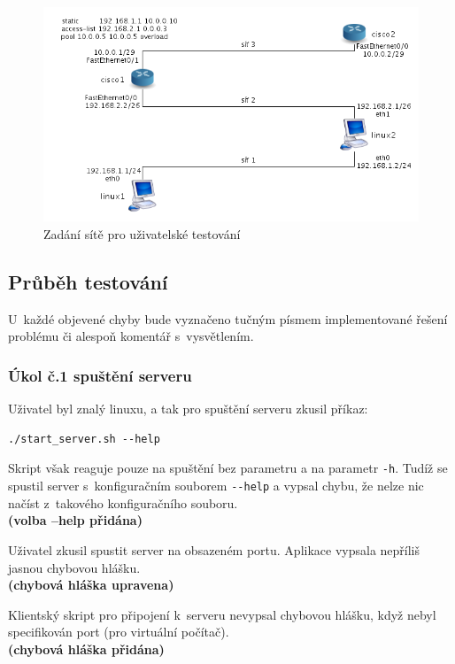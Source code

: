 \begin{figure}[h]
\begin{center}
\includegraphics[width=15cm]{figures/testovani}
\caption{Zadání sítě pro uživatelské testování}
\label{fig:testovani}
\end{center}
\end{figure}


\subsection{Průběh testování}
U~každé objevené chyby bude vyznačeno tučným písmem implementované řešení problému či alespoň komentář s~vysvětlením. 

\subsubsection{Úkol č.1 spuštění serveru}
Uživatel byl znalý linuxu, a tak pro spuštění serveru zkusil příkaz:
\begin{verbatim}
./start_server.sh --help
\end{verbatim}
Skript však reaguje pouze na spuštění bez parametru a na parametr \verb|-h|. Tudíž se spustil server s~konfiguračním souborem \verb|--help| a vypsal chybu, že nelze nic načíst z~takového konfiguračního souboru.
\\\textbf{(volba --help přidána)}

Uživatel zkusil spustit server na obsazeném portu. Aplikace vypsala nepříliš jasnou chybovou hlášku.
\\\textbf{(chybová hláška upravena)}

Klientský skript pro připojení k~serveru nevypsal chybovou hlášku, když nebyl specifikován port (pro virtuální počítač).
\\\textbf{(chybová hláška přidána)}

